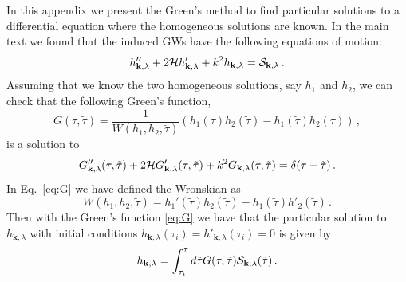 \documentclass[a4paper,11pt]{article}
\numberwithin{equation}{section}
\begin{document}
In this appendix we present the Green's method to find particular solutions to a differential equation where the homogeneous solutions are known. In the main text we found that the induced GWs have the following equations of motion:
\begin{equation}\label{eq:eominducedGWapp}
h''_{\mathbf{k},\lambda}+2{\cal H} h'_{\mathbf{k},\lambda}+k^2 h_{\mathbf{k},\lambda}={\cal S}_{\mathbf{k},\lambda}\,.
\end{equation}
Assuming that we know the two homogeneous solutions, say $h_1$ and $h_2$, we can check that the following Green's function,
\begin{equation}\label{eq:G}
G(\tau,\tilde \tau)=\frac{1}{W(h_1,h_2,\tilde \tau)}\left(h_1(\tau)h_2(\tilde\tau)-h_1(\tilde\tau)h_2(\tau)\right)\,,
\end{equation}
is a solution to
\begin{equation}\label{eq:eominducedGWapp2}
G''_{\mathbf{k},\lambda}(\tau,\tilde\tau)+2{\cal H} G'_{\mathbf{k},\lambda}(\tau,\tilde\tau)+k^2 G_{\mathbf{k},\lambda}(\tau,\tilde\tau)=\delta(\tau-\tilde\tau)\,.
\end{equation}
In Eq.~\eqref{eq:G} we have defined the Wronskian as
\begin{equation}
W(h_1,h_2,\tilde \tau)=h_1'(\tilde\tau)h_2(\tilde\tau)-h_1(\tilde\tau)h'_2(\tilde\tau)\,.
\end{equation}
Then with the Green's function \eqref{eq:G} we have that the particular solution to $h_{\mathbf{k},\lambda}$ with initial conditions $h_{\mathbf{k},\lambda}(\tau_i)=h'_{\mathbf{k},\lambda}(\tau_i)=0$ is given by
\begin{equation}
h_{\mathbf{k},\lambda}=\int_{\tau_i}^{\tau}d\tilde\tau G(\tau,\tilde \tau){\cal S}_{\mathbf{k},\lambda}(\tilde\tau)\,.
\end{equation}
\end{document}
